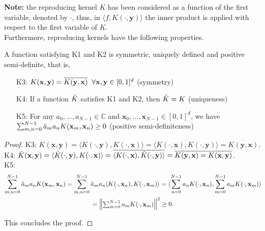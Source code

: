 \textbf{Note:} the reproducing kernel $K$ has been considered as a function of the first variable, denoted by $\cdot$, thus, in $\langle f,K(\cdot,\textbf{y}) \rangle$ the inner product is applied with respect to the first variable of $K$.\\


Furthermore, reproducing kernels have the following properties.\\

\begin{Corollary}
    A function satisfying K1 and K2 is symmetric, uniquely defined and positive semi-definite, that is,
    \begin{itemize} 
        \item[K3:]\label{K3} $K(\textbf{x},\textbf{y}) = \overline{K(\textbf{y},\textbf{x})} \hspace{2mm} \forall \textbf{x},\textbf{y} \in [0,1]^d$ (symmetry) 
        \item[K4:]\label{K4} If a function $\Tilde{K}$ satisfies K1 and K2, then $\Tilde{K} = K$ (uniqueness)
        \item[K5:]\label{K5} For any $a_0,...,a_{N-1} \in \mathbb{C}$ and $\textbf{x}_0,...,\textbf{x}_{N-1} \in [0,1]^d$, we have $\sum_{m,n=0}^{N-1} \Tilde{a}_m a_n K(\textbf{x}_m,\textbf{x}_n) \geq 0$ (positive semi-definiteness) 
    \end{itemize}
\end{Corollary}
\begin{proof} K3: $K(\textbf{x},\textbf{y}) = \langle K(\cdot,\textbf{y}),K(\cdot,\textbf{x}) \rangle = \overline{\langle K(\cdot,\textbf{x}),K(\cdot,\textbf{y}) \rangle} = \overline{K(\textbf{y},\textbf{x})} $.\\
K4: $\Tilde{K}(\textbf{x},\textbf{y}) = \langle \Tilde{K}(\cdot,\textbf{y}),K(\cdot,\textbf{x}) \rangle = \overline{\langle K(\cdot,\textbf{x}),\Tilde{K}(\cdot,\textbf{y}) \rangle} = \overline{K(\textbf{y},\textbf{x}) = K(\textbf{x},\textbf{y})}$.\\
K5: 
\begin{multline*}
    \sum_{m,n=0}^{N-1} \Tilde{a}_m a_n K(\textbf{x}_m,\textbf{x}_n) = \sum_{m,n=0}^{N-1} \Tilde{a}_m a_n \langle K(\cdot,\textbf{x}_n),K(\cdot,\textbf{x}_m) \rangle = \langle \sum_{n=0}^{N-1} a_n K(\cdot,\textbf{x}_n),\sum_{m=0}^{N-1} a_m K(\cdot,\textbf{x}_m) \rangle \\
    = \begin{Vmatrix} \sum_{m=0}^{N-1} a_m K(\cdot,\textbf{x}_m) \end{Vmatrix}^2 \geq 0.
\end{multline*} 

This concludes the proof.
\end{proof}

